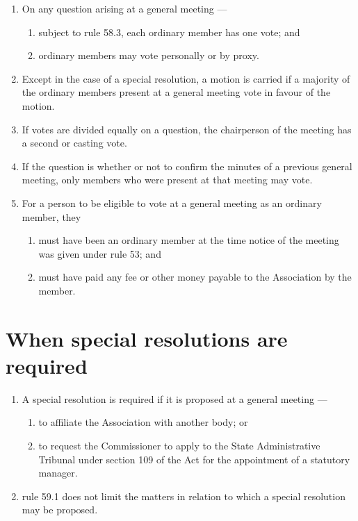 \begin{enumerate}

\item On any question arising at a general meeting ---

  \begin{enumerate}
  
  \item subject to rule 58.3, each ordinary member has one vote; and
  \item ordinary members may vote personally or by proxy.
  \end{enumerate}
\item Except in the case of a special resolution, a motion is carried if a majority of the ordinary members present at a general meeting vote in favour of the motion.
\item If votes are divided equally on a question, the chairperson of the meeting has a second or casting vote.
\item If the question is whether or not to confirm the minutes of a previous general meeting, only members who were present at that meeting may vote.
\item For a person to be eligible to vote at a general meeting as an ordinary member, they

  \begin{enumerate}
  
  \item must have been an ordinary member at the time notice of the meeting was given under rule 53; and
  \item must have paid any fee or other money payable to the Association by the member.
  \end{enumerate}
\end{enumerate}

\hypertarget{when-special-resolutions-are-required}{%
\section{When special resolutions are required}\label{when-special-resolutions-are-required}}

\begin{enumerate}

\item A special resolution is required if it is proposed at a general meeting ---

  \begin{enumerate}
  
  \item to affiliate the Association with another body; or
  \item to request the Commissioner to apply to the State Administrative Tribunal under section 109 of the Act for the appointment of a statutory manager.
  \end{enumerate}
\item rule 59.1 does not limit the matters in relation to which a special resolution may be proposed.
\end{enumerate}

